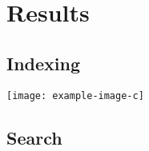 
\chapter{Results}

\section{Indexing}
\texttt{[image: example-image-c]}

\section{Search}

\cleardoublepage